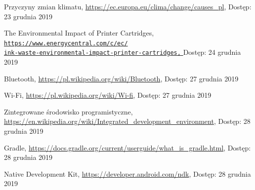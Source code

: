 \documentclass[a4paper,12pt, twoside]{article}
\begin{document}
     	\begingroup
    	\renewcommand{\section}[2]{}
    	\begin{thebibliography}{}
    		
    		Przyczyny zmian klimatu,
    		\newline\url{https://ec.europa.eu/clima/change/causes\_pl}, 
    		\newline Dostęp: 23 grudnia 2019
    		
    		The Environmental Impact of Printer Cartridges,
    		\newline\href{https://www.energycentral.com/c/ec/ink-waste-environmental-impact-printer-cartridges}
    		 {\nolinkurl{https://www.energycentral.com/c/ec/}
                 \\
                  \nolinkurl{ink-waste-environmental-impact-printer-cartridges,}
                 }
    		\newline Dostęp: 24 grudnia 2019
    		
    		Bluetooth,
    		\newline\url{https://pl.wikipedia.org/wiki/Bluetooth}, 
    		\newline Dostęp: 27 grudnia 2019
    			
    		Wi-Fi,
    		\newline\url{https://pl.wikipedia.org/wiki/Wi-fi}, 
    		\newline Dostęp: 27 grudnia 2019
    		
    		Zintegrowane środowisko programistyczne,
    		\newline\url{https://en.wikipedia.org/wiki/Integrated_development_environment}, 
    		\newline Dostęp: 28 grudnia 2019
    		
    		Gradle,
    		\newline\url{https://docs.gradle.org/current/userguide/what_is_gradle.html}, 
    		\newline Dostęp: 28 grudnia 2019
    		
    		Native Development Kit,
    		\newline\url{https://developer.android.com/ndk}, 
    		\newline Dostęp: 28 grudnia 2019
    		

\end{thebibliography}
\end{document}
